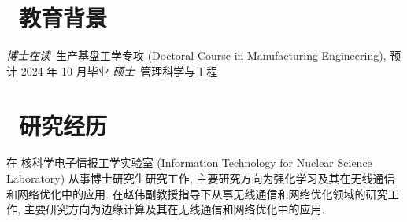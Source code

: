 \documentclass{resume}
\begin{document}


 
\section{\faGraduationCap\  教育背景}
\textit{博士在读}\ 生产基盘工学专攻 (Doctoral Course in Manufacturing Engineering), 预计 2024 年 10 月毕业
\textit{硕士}\ 管理科学与工程

\section{\faInfo\ 研究经历}
在 核科学电子情报工学实验室 (Information Technology for Nuclear Science Laboratory) 从事博士研究生研究工作, 主要研究方向为强化学习及其在无线通信和网络优化中的应用.
在赵伟副教授指导下从事无线通信和网络优化领域的研究工作, 主要研究方向为边缘计算及其在无线通信和网络优化中的应用.



\end{document}
